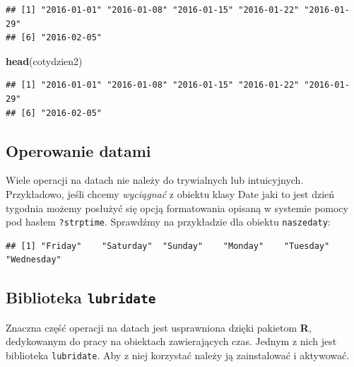 \documentclass[]{book}
\newenvironment{Shaded}{\begin{snugshade}}{\end{snugshade}}
\newcommand{\KeywordTok}[1]{\textcolor[rgb]{0.13,0.29,0.53}{\textbf{#1}}}
\newcommand{\StringTok}[1]{\textcolor[rgb]{0.31,0.60,0.02}{#1}}
\newcommand{\NormalTok}[1]{#1}
\theoremstyle{definition}
\theoremstyle{definition}
\theoremstyle{definition}
\theoremstyle{remark}
\begin{document}
\begin{verbatim}
## [1] "2016-01-01" "2016-01-08" "2016-01-15" "2016-01-22" "2016-01-29"
## [6] "2016-02-05"
\end{verbatim}

\begin{Shaded}
\begin{Highlighting}[]
\KeywordTok{head}\NormalTok{(cotydzien2)}
\end{Highlighting}
\end{Shaded}

\begin{verbatim}
## [1] "2016-01-01" "2016-01-08" "2016-01-15" "2016-01-22" "2016-01-29"
## [6] "2016-02-05"
\end{verbatim}

\subsection{Operowanie datami}\label{operowanie-datami}

Wiele operacji na datach nie należy do trywialnych lub intuicyjnych.
Przykładowo, jeśli chcemy \emph{wyciągnać} z obiektu klasy Date jaki to
jest dzień tygodnia możemy posłużyć się opcją formatowania opisaną w
systemie pomocy pod hasłem \texttt{?strptime}. Sprawdźmy na przykładzie
dla obiektu \texttt{naszedaty}:

\begin{Shaded}
\end{Shaded}

\begin{verbatim}
## [1] "Friday"    "Saturday"  "Sunday"    "Monday"    "Tuesday"   "Wednesday"
\end{verbatim}

\subsection{\texorpdfstring{Biblioteka
\texttt{lubridate}}{Biblioteka lubridate}}\label{biblioteka-lubridate}

Znaczna część operacji na datach jest usprawniona dzięki pakietom
\textbf{R}, dedykowanym do pracy na obiektach zawierających czas. Jednym
z nich jest biblioteka \texttt{lubridate}. Aby z niej korzystać należy
ją zainstalować i aktywować.
\end{document}

